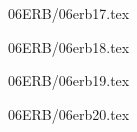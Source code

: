 \documentclass[9pt, xcolor={svgnames, x11names},professionalfonts]{beamer}
\def\scale{1}
\begin{document}

\begin{frame}{06ERB/06erb17.tex}	
	\def\scale{0.625}
	\tcb{
		\centering
		
	}
\end{frame}


\begin{frame}{06ERB/06erb18.tex}	
	\def\scale{0.55}
	\tcb{
		\centering
		
	}
\end{frame}


\begin{frame}{06ERB/06erb19.tex}	
	\def\scale{0.55}
	\tcb{
		\centering
		
	}
\end{frame}


\begin{frame}{06ERB/06erb20.tex}	
	\def\scale{0.875}
	\tcb{
		\centering
		
	}
\end{frame}




\end{document}
